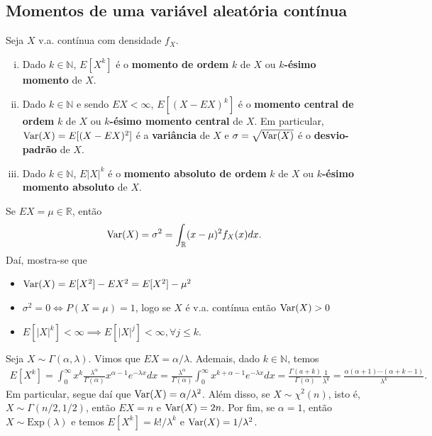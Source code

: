 \documentclass[../Notas.tex]{subfiles}
\begin{document}
\subsection{Momentos de uma variável aleatória contínua}
Seja $X$ v.a. contínua com densidade $f_X$.
\begin{definition}
\begin{enumerate}[(i)]
    \item Dado $k\in\mathbb{N}$, $E[X^k]$ é o \textbf{momento de ordem} $k$ de $X$ ou $k$\textbf{-ésimo momento} de $X$.
    \item Dado $k\in\mathbb{N}$ e sendo $EX<\infty$, $E[(X-EX)^k]$ é o \textbf{momento central de ordem} $k$ de $X$ ou $k$\textbf{-ésimo momento central} de $X$. Em particular, $\text{Var}(X) = E[(X-EX)^2]$ é a \textbf{variância} de $X$ e $\sigma = \sqrt{\text{Var}(X)}$ é o \textbf{desvio-padrão} de $X$.
    \item Dado $k\in\mathbb{N}$, $E|X|^k$ é o \textbf{momento absoluto de ordem} $k$ de $X$ ou $k$\textbf{-ésimo momento absoluto} de $X$.
\end{enumerate}
\end{definition}

\begin{remark}
Se $EX = \mu\in\mathbb{R}$, então
\begin{align*}
    \text{Var}(X) = \sigma^2 = \int_{\mathbb{R}} (x-\mu)^2 f_X(x) dx.
\end{align*}
Daí, mostra-se que
\begin{itemize}
    \item $\text{Var}(X) = E[X^2] - EX^2 = E[X^2] - \mu^2$
    \item $\sigma^2 = 0 \iff P(X=\mu) = 1$, logo se $X$ é v.a. contínua então $\text{Var}(X) > 0$
    \item $E[|X|^k]<\infty \implies E[|X|^j]<\infty, \forall j\leq k$.
\end{itemize}
\end{remark}

\begin{example}
Seja $X\sim\Gamma(\alpha, \lambda)$. Vimos que $EX = \alpha/\lambda$. Ademais, dado $k\in\mathbb{N}$, temos
\begin{align*}
    E[X^k] = \int_{0}^{\infty} x^k\frac{\lambda^{\alpha}}{\Gamma(\alpha)}x^{\alpha - 1}e^{-\lambda x} dx = \frac{\lambda^{\alpha}}{\Gamma(\alpha)}\int_{0}^{\infty} x^{k+\alpha - 1}e^{-\lambda x} dx = \frac{\Gamma(a+k)}{\Gamma(\alpha)}\frac{1}{\lambda^k} = \frac{\alpha(\alpha+1)\cdots(\alpha+k-1)}{\lambda^k}.
\end{align*}
Em particular, segue daí que $\text{Var}(X) = \alpha/\lambda^2$. Além disso, se $X\sim\chi^2(n)$, isto é, $X\sim\Gamma(n/2, 1/2)$, então $EX = n$ e $\text{Var}(X) = 2n$. Por fim, se $\alpha = 1$, então $X\sim\text{Exp}(\lambda)$ e temos $E[X^k] = k!/\lambda^k$ e $\text{Var}(X) = 1/\lambda^2$.
\end{example}
\end{document}
